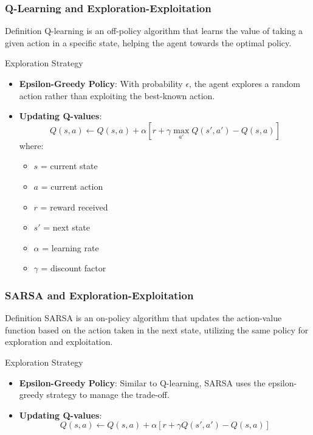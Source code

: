 \documentclass[aspectratio=169]{beamer}
\begin{document}
\begin{frame}[fragile]
    \frametitle{Q-Learning and Exploration-Exploitation}
    \begin{block}{Definition}
        Q-learning is an off-policy algorithm that learns the value of taking a given action in a specific state, helping the agent towards the optimal policy.
    \end{block}
    
    \begin{block}{Exploration Strategy}
        \begin{itemize}
            \item \textbf{Epsilon-Greedy Policy}: With probability $\epsilon$, the agent explores a random action rather than exploiting the best-known action.
            \item \textbf{Updating Q-values}: 
            \begin{equation}
            Q(s, a) \leftarrow Q(s, a) + \alpha \left[ r + \gamma \max_{a'} Q(s', a') - Q(s, a) \right]
            \end{equation}
            where:
            \begin{itemize}
                \item $s$ = current state
                \item $a$ = current action
                \item $r$ = reward received
                \item $s'$ = next state
                \item $\alpha$ = learning rate
                \item $\gamma$ = discount factor
            \end{itemize}
        \end{itemize}
    \end{block}
\end{frame}

\begin{frame}[fragile]
    \frametitle{SARSA and Exploration-Exploitation}
    \begin{block}{Definition}
        SARSA is an on-policy algorithm that updates the action-value function based on the action taken in the next state, utilizing the same policy for exploration and exploitation.
    \end{block}
    
    \begin{block}{Exploration Strategy}
        \begin{itemize}
            \item \textbf{Epsilon-Greedy Policy}: Similar to Q-learning, SARSA uses the epsilon-greedy strategy to manage the trade-off.
            \item \textbf{Updating Q-values}:
            \begin{equation}
            Q(s, a) \leftarrow Q(s, a) + \alpha \left[ r + \gamma Q(s', a') - Q(s, a) \right]
            \end{equation}
        \end{itemize}
    \end{block}
\end{frame}
\end{document}
